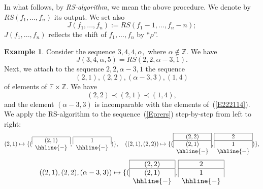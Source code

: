 \documentclass[10pt]{amsart}\oddsidemargin -1mm \evensidemargin -1mm \topmargin -15mm\headheight5mm \headsep 3.5mm \textheight 245mm\textwidth 170mm
\theoremstyle{definition}\newtheorem{theorem}{Theorem}[section]\newtheorem{lemma}[theorem]{Lemma}\newtheorem{remark}[theorem]{Remark}\newtheorem{proposition}[theorem]{Proposition}\newtheorem{corollary}[theorem]{Corollary}\newtheorem{definition}[theorem]{Definition}\newtheorem{Ex}[theorem]{Example}\newtheorem{obs}[theorem]{Observation}\newtheorem{nota}[theorem]{Notation}
\begin{document}
In what follows, by {\it RS-algorithm}, we mean the above procedure. 
We denote by $RS(f_1,..., f_n)$ its output. 
We set also $$J(f_1,..., f_n):=RS(f_1-1,..., f_n-n);$$
$J(f_1,..., f_n)$ reflects the shift of $f_1,..., f_n$ by ``$\rho$''. 
\begin{Ex}Consider the sequence $3, 4, 4, \alpha,$ where $\alpha\notin\mathbb Z$. We have
$$J(3, 4, \alpha, 5)=RS(2, 2, \alpha-3, 1).$$
Next, we attach to the sequence $2, 2, \alpha-3, 1$ the sequence
\begin{equation}(2, 1), (2, 2), (\alpha-3, 3), (1, 4)\label{Eprers}\end{equation}
of elements of $\mathbb F\times\mathbb Z$. We have
\begin{equation}(2, 2)\prec (2, 1)\prec (1, 4),\label{E222114}\end{equation}
and the element $(\alpha-3, 3)$ is incomparable with the elements of~(\ref{E222114}). 
We apply the RS-algorithm to the sequence~(\ref{Eprers}) step-by-step from left to right:
$$(2, 1)\mapsto\{(\begin{array}{c}
\hline\multicolumn{1}{|c|}{(2, 1)}\\
\hhline{-}
\end{array}, \begin{array}{c}
\hline\multicolumn{1}{|c|}{1}\\
\hhline{-}
\end{array})\},\hspace{10pt}
((2, 1), (2, 2))\mapsto
\{(\begin{array}{c}
\hline\multicolumn{1}{|c|}{(2, 2)}\\
\hline\multicolumn{1}{|c|}{(2, 1)}\\
\hhline{-}
\end{array},
\begin{array}{c}
\hline\multicolumn{1}{|c|}{2}\\
\hline\multicolumn{1}{|c|}{1}\\
\hhline{-}
\end{array})
\},$$
$$((2, 1), (2, 2), (\alpha-3, 3))\mapsto
\{(\begin{array}{cc}
\hline\multicolumn{1}{|c|}{(2, 2)}\\
\hline\multicolumn{1}{|c|}{(2, 1)}\\
\hhline{-}
\end{array},
\begin{array}{cc}
\hline\multicolumn{1}{|c|}{2}\\
\hline\multicolumn{1}{|c|}{1}\\
\hhline{-}

\end{array}$$
\end{Ex}
\end{document}
